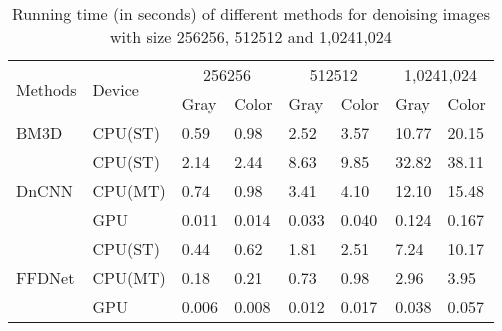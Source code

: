 \documentclass[journal]{IEEEtran}
\begin{document}
\begin{table}[!htbp]\footnotesize{}
\caption{Running time (in seconds) of different methods for denoising images with size 256256, 512512 and 1,0241,024}
\center
\begin{tabular}{|p{0.9cm}<{\centering}|p{1cm}<{\centering}|p{0.56cm}<{\centering}|p{0.56cm}<{\centering}|p{0.56cm}<{\centering}|p{0.56cm}<{\centering}|p{0.56cm}<{\centering}|p{0.56cm}<{\centering}|}\hline
  \multirow{2}{*}{Methods} & \multirow{2}{*}{Device} & \multicolumn{2}{c|}{\scriptsize 256256}   & \multicolumn{2}{c|}{\scriptsize 512512}  & \multicolumn{2}{c|}{\scriptsize 1,0241,024}  \\ &   & \cellcolor[rgb]{.9,.9,.9} Gray & \cellcolor[rgb]{.75,.75,.75}Color   & \cellcolor[rgb]{.9,.9,.9}Gray  & \cellcolor[rgb]{.75,.75,.75}Color  & \cellcolor[rgb]{.9,.9,.9}Gray & \cellcolor[rgb]{.75,.75,.75}Color  \\ \hline
  BM3D& CPU(ST)  & \cellcolor[rgb]{.9,.9,.9}0.59 & \cellcolor[rgb]{.75,.75,.75}0.98 & \cellcolor[rgb]{.9,.9,.9}2.52 & \cellcolor[rgb]{.75,.75,.75}3.57  & \cellcolor[rgb]{.9,.9,.9}10.77 & \cellcolor[rgb]{.75,.75,.75}20.15 \\\hline &  CPU(ST)  & \cellcolor[rgb]{.9,.9,.9}2.14  & \cellcolor[rgb]{.75,.75,.75}2.44 & \cellcolor[rgb]{.9,.9,.9}8.63 & \cellcolor[rgb]{.75,.75,.75}9.85 & \cellcolor[rgb]{.9,.9,.9}32.82& \cellcolor[rgb]{.75,.75,.75}38.11 \\
   DnCNN & CPU(MT)  & \cellcolor[rgb]{.9,.9,.9}0.74& \cellcolor[rgb]{.75,.75,.75}0.98 &\cellcolor[rgb]{.9,.9,.9}3.41 & \cellcolor[rgb]{.75,.75,.75}4.10 & \cellcolor[rgb]{.9,.9,.9}12.10 & \cellcolor[rgb]{.75,.75,.75}15.48 \\&  GPU  & \cellcolor[rgb]{.9,.9,.9}0.011 & \cellcolor[rgb]{.75,.75,.75}0.014 &  \cellcolor[rgb]{.9,.9,.9}0.033& \cellcolor[rgb]{.75,.75,.75}0.040 & \cellcolor[rgb]{.9,.9,.9}0.124& \cellcolor[rgb]{.75,.75,.75}0.167  \\\hline
           & CPU(ST)  & \cellcolor[rgb]{.9,.9,.9}0.44& \cellcolor[rgb]{.75,.75,.75}0.62 & \cellcolor[rgb]{.9,.9,.9}1.81 & \cellcolor[rgb]{.75,.75,.75}2.51 &  \cellcolor[rgb]{.9,.9,.9}7.24 & \cellcolor[rgb]{.75,.75,.75}10.17 \\FFDNet                    &  CPU(MT)  & \cellcolor[rgb]{.9,.9,.9}0.18  &\cellcolor[rgb]{.75,.75,.75}0.21 & \cellcolor[rgb]{.9,.9,.9}0.73 & \cellcolor[rgb]{.75,.75,.75}0.98 &  \cellcolor[rgb]{.9,.9,.9}2.96 & \cellcolor[rgb]{.75,.75,.75}3.95\\
                                         &  GPU  & \cellcolor[rgb]{.9,.9,.9}0.006  &\cellcolor[rgb]{.75,.75,.75}0.008 & \cellcolor[rgb]{.9,.9,.9}0.012 & \cellcolor[rgb]{.75,.75,.75}0.017 &  \cellcolor[rgb]{.9,.9,.9}0.038 & \cellcolor[rgb]{.75,.75,.75}0.057\\
  \hline
\end{tabular}
\label{table4}\end{table}
\end{document}
